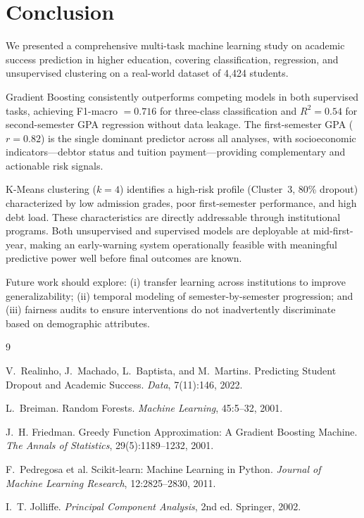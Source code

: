 \documentclass{article}
\begin{document}
\section{Conclusion}

We presented a comprehensive multi-task machine learning study on academic success prediction in higher education, covering classification, regression, and unsupervised clustering on a real-world dataset of 4,424 students.

Gradient Boosting consistently outperforms competing models in both supervised tasks, achieving F1-macro $=0.716$ for three-class classification and $R^2=0.54$ for second-semester GPA regression without data leakage. The first-semester GPA ($r=0.82$) is the single dominant predictor across all analyses, with socioeconomic indicators---debtor status and tuition payment---providing complementary and actionable risk signals.

K-Means clustering ($k=4$) identifies a high-risk profile (Cluster~3, 80\% dropout) characterized by low admission grades, poor first-semester performance, and high debt load. These characteristics are directly addressable through institutional programs. Both unsupervised and supervised models are deployable at mid-first-year, making an early-warning system operationally feasible with meaningful predictive power well before final outcomes are known.

Future work should explore: (i) transfer learning across institutions to improve generalizability; (ii) temporal modeling of semester-by-semester progression; and (iii) fairness audits to ensure interventions do not inadvertently discriminate based on demographic attributes.

\begin{thebibliography}{9}

V.~Realinho, J.~Machado, L.~Baptista, and M.~Martins.
\newblock Predicting Student Dropout and Academic Success.
\newblock \emph{Data}, 7(11):146, 2022.

L.~Breiman.
\newblock Random Forests.
\newblock \emph{Machine Learning}, 45:5--32, 2001.

J.~H. Friedman.
\newblock Greedy Function Approximation: A Gradient Boosting Machine.
\newblock \emph{The Annals of Statistics}, 29(5):1189--1232, 2001.

F.~Pedregosa et al.
\newblock Scikit-learn: Machine Learning in Python.
\newblock \emph{Journal of Machine Learning Research}, 12:2825--2830, 2011.

I.~T. Jolliffe.
\newblock \emph{Principal Component Analysis}, 2nd ed.
\newblock Springer, 2002.

\end{thebibliography}
\end{document}
